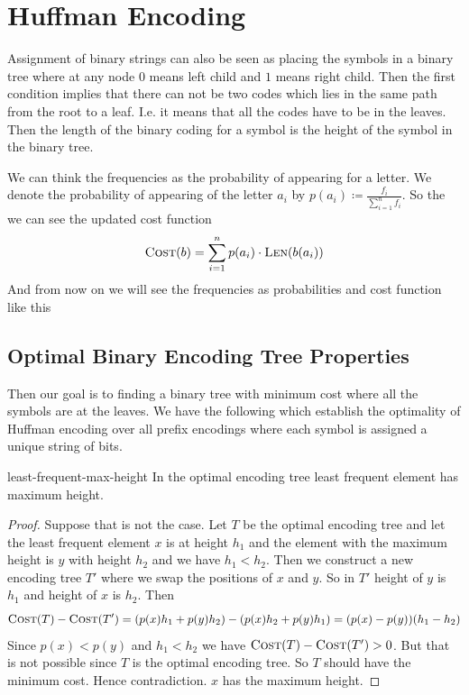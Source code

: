 \section{Huffman Encoding}
\begin{algoprob}
\end{algoprob}

Assignment of binary strings can also be seen as placing the symbols in a binary tree where at any node $0$ means left child and $1$ means right child. Then the first condition implies that there can not be two codes which lies in the same path from the root to a leaf. I.e. it means that all the codes have to be in the leaves. Then the length of the binary coding for a symbol  is the height of the symbol in the binary tree. 

We can think the frequencies as the probability of appearing for a letter. We denote the probability of appearing of the letter $a_i$ by $p(a_i)\coloneqq \frac{f_i}{\sum\limits_{i=1}^nf_i}$. So the we can see the updated cost function $$\textsc{Cost}(b)=\sum\limits_{i=1}^n p(a_i)\cdot\textsc{Len}(b(a_i))$$And from now on we will see the frequencies as probabilities and cost function like this

\subsection{Optimal Binary Encoding Tree Properties}
Then our goal is to finding a binary tree with minimum cost where all the symbols are at the leaves. We have the following which establish the optimality of Huffman encoding over all prefix encodings where each symbol is assigned a unique string of bits.
\begin{lemma}{}{least-frequent-max-height}
	In the optimal encoding tree  least frequent element has maximum height.
\end{lemma}
\begin{proof}
	Suppose that is not the case. Let $T$ be the optimal encoding tree and let the least frequent element $x$ is at height $h_1$ and the element with the maximum height is $y$ with height $h_2$ and we have $h_1<h_2$.  Then we construct a new encoding tree $T'$ where we swap the positions of $x$ and $y$. So in $T'$ height of $y$ is $h_1$ and height of $x$ is $h_2$. Then $$\textsc{Cost}(T)-\textsc{Cost}(T')=(p(x)h_1+p(y)h_2)-(p(x)h_2+p(y)h_1)=(p(x)-p(y))(h_1-h_2)$$Since $p(x)<p(y)$ and $h_1<h_2$ we have $\textsc{Cost}(T)-\textsc{Cost}(T')>0$. But that is not possible since $T$ is the optimal encoding tree. So $T$ should have the minimum cost. Hence contradiction. $x$ has the maximum height.
\end{proof}

